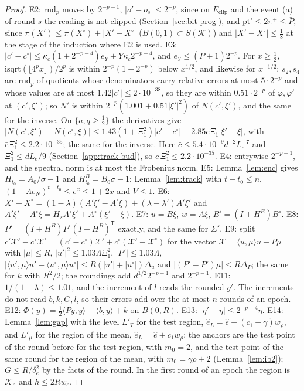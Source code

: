 \documentclass[11pt]{amsart}
\theoremstyle{definition}
\numberwithin{equation}{section}
\newcommand{\cK}{\mathcal{K}}
\newcommand{\ip}[1]{\langle #1\rangle}
\begin{document}
\begin{proof}
E2: $\mathrm{rnd}_p$ moves by $2^{-p-1}$, $|o'-o_s|\le2^{-p}$, since on $E_{\mathrm{clip}}$ and the event (a) of round $s$ the reading is not clipped (Section~\ref{sec:bit-prog}), and $\mathrm{pt}'\le2\pi^+\le\bar P$, since $\pi(X')\le\pi(X^\circ)+|X'-X^\circ|$ ($B(0,1)\subset S(\cK)$) and $|X'-X^\circ|\le\frac18$ at the stage of the induction where E2 is used.
E3: $|c'-c^\circ|\le\kappa_c(1+2^{-p-4})e_Y+\bar Y\kappa_c2^{-p-4}$, and $e_Y\le(\bar P+1)2^{-p}$. For $x\ge\frac12$, $\mathrm{isqrt}(\lfloor4^px\rfloor)/2^p$ is within $2^{-p}(1+2^{-p})$ below $x^{1/2}$, and likewise for $x^{-1/2}$; $s_2,s_4$ are $\mathrm{rnd}_p$ of quotients whose denominators carry relative errors at most $5\cdot2^{-p}$ and whose values are at most $1.42|c'|\le2\cdot10^{-38}$, so they are within $0.51\cdot2^{-p}$ of $\varphi,\varphi'$ at $(c',\xi')$; so $N'$ is within $2^{-p}(1.001+0.51|\xi'|^2)$ of $N(c',\xi')$, and the same for the inverse. On $\{a,q\ge\frac12\}$ the derivatives give $|N(c',\xi')-N(c^\circ,\xi)|\le1.43(1+\Xi_1^2)|c'-c^\circ|+2.85\bar c\Xi_1|\xi'-\xi|$, with $\bar c\Xi_1^2\le2.2\cdot10^{-35}$; the same for the inverse. Here $\bar c\le5.4\cdot10^{-9}d^{-2}L_e^{-7}$ and $\Xi_1^2\le dL_e/9$ (Section~\ref{app:track-bud}), so $\bar c\,\Xi_1^2\le2.2\cdot10^{-35}$.
E4: entrywise $2^{-p-1}$, and the spectral norm is at most the Frobenius norm.
E5: Lemma~\ref{lem:enc} gives $H_{t_0}=A_0/\sigma-1$ and $H^B_{t_0}=B_0\sigma-1$; Lemma~\ref{lem:track} with $t-t_0\le n$, $(1+\Lambda e_N)^{t-t_0}\le e^x\le1+2x$ and $V\le1$.
E6: $X'-X^\circ=(1-\lambda)(A'\xi'-A^\circ\xi)+(\lambda-\lambda')A'\xi'$ and $A'\xi'-A^\circ\xi=H_sA^\circ\xi'+A^\circ(\xi'-\xi)$.
E7: $u=B\xi$, $w=A\xi$, $B'=(I+H^B)B^\circ$.
E8: $P'=(I+H^B)P^\circ(I+H^B)^{\mathsf T}$ exactly, and the same for $\Sigma'$.
E9: split $c'\mathcal X'-c^\circ\mathcal X^\circ=(c'-c^\circ)\mathcal X'+c^\circ(\mathcal X'-\mathcal X^\circ)$ for the vector $\mathcal X=\ip{u,\mu}u-P\mu$ with $|\mu|\le R$, $|u'|^2\le1.03\Lambda\Xi_1^2$, $|P'|\le1.03\Lambda$, $|\ip{u',\mu}u'-\ip{u^\circ,\mu}u^\circ|\le R(|u'|+|u^\circ|)\Delta_u$ and $|(P'-P^\circ)\mu|\le R\Delta_P$; the same for $k$ with $R^2/2$; the roundings add $d^{1/2}2^{-p-1}$ and $2^{-p-1}$.
E11: $1/(1-\lambda)\le1.01$, and the increment of $l$ reads the rounded $g'$. The increments do not read $b,k,G,l$, so their errors add over the at most $n$ rounds of an epoch.
E12: $\Phi(y)=\frac12\ip{Py,y}-\ip{b,y}+k$ on $B(0,R)$.
E13: $|\eta'-\eta|\le2^{-p-4}\eta$.
E14: Lemma~\ref{lem:gap} with the level $L'_T$ for the test region, $\hat e_L=\hat e+(c_1-\gamma)w_\rho$, and $L'_\mu$ for the region of the mean, $\hat e_L=\hat e+c_1w_\rho$; the anchors are the test point of the round before for the test region, with $m_0=2$, and the test point of the same round for the region of the mean, with $m_0=\gamma\rho+2$ (Lemma~\ref{lem:ib2}); $G\le R/\delta_e^2$ by the facts of the round. In the first round of an epoch the region is $\cK_\varepsilon$ and $h\le2Rw_\varepsilon$.

\end{proof}
\end{document}
